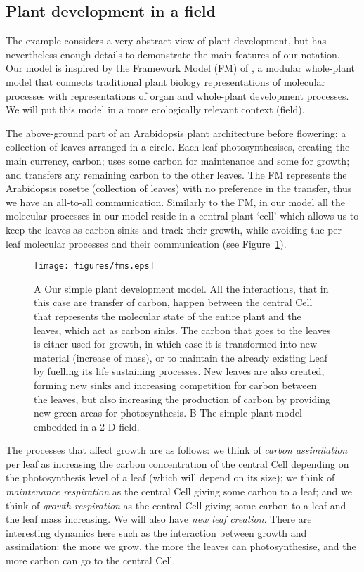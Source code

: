 \subsection{Plant development in a field}
\label{sec:plantDev}
The example considers a very abstract view of plant development, but has
nevertheless enough details to demonstrate the main features of our
notation. Our model is inspired by the Framework Model (FM) of
\citet{chew_multiscale_2014}, a modular whole-plant model that connects
traditional plant biology representations of molecular processes with
representations of organ and whole-plant development processes. We will put this
model in a more ecologically relevant context (field).

The above-ground part of an Arabidopsis plant
architecture before flowering: a collection of leaves arranged in a circle. Each
leaf photosynthesises, creating the main currency, carbon; uses some carbon for
maintenance and some for growth; and transfers any remaining carbon to the other
leaves. The FM represents the Arabidopsis rosette (collection of leaves) with no
preference in the transfer, thus we have an all-to-all communication. Similarly
to the FM, in our model all the molecular processes in our model reside in a
central plant `cell' which allows us to keep the leaves as carbon sinks and
track their growth, while avoiding the per-leaf molecular processes and their
communication (see Figure~\ref{fig:fmsField}).

\begin{figure}
\centering
\texttt{[image: figures/fms.eps]}
\caption{ A Our simple plant development model. All the interactions, that in
  this case are transfer of carbon, happen between the central Cell that
  represents the molecular state of the entire plant and the leaves, which act
  as carbon sinks. The carbon that goes to the leaves is either used for growth,
  in which case it is transformed into new material (increase of mass), or to
  maintain the already existing Leaf by fuelling its life sustaining
  processes. New leaves are also created, forming new sinks and increasing
  competition for carbon between the leaves, but also increasing the production
  of carbon by providing new green areas for photosynthesis. B The simple plant
  model embedded in a 2-D field.}
\label{fig:fmsField}
\end{figure}

The processes that affect growth are as follows: we think of \textit{carbon
assimilation} per leaf as increasing the carbon concentration of the central
Cell depending on the photosynthesis level of a leaf (which will depend on its
size); we think of \textit{maintenance respiration} as the central Cell giving
some carbon to a leaf; and we think of \textit{growth respiration} as the
central Cell giving some carbon to a leaf and the leaf mass increasing. We will
also have \textit{new leaf creation}. There are interesting dynamics here such
as the interaction between growth and assimilation: the more we grow, the more
the leaves can photosynthesise, and the more carbon can go to the central Cell.

